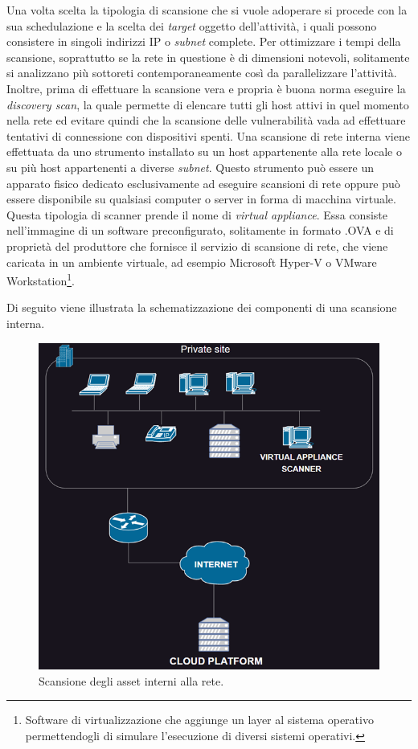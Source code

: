 \documentclass[target=mst,aauheader=]{thud}
\begin{document}
Una volta scelta la tipologia di scansione che si vuole adoperare si procede con la sua schedulazione e la scelta dei \textit{target} oggetto dell’attività, i quali possono consistere in singoli indirizzi IP o \textit{subnet} complete. Per ottimizzare i tempi della scansione, soprattutto se la rete in questione è di dimensioni notevoli, solitamente si analizzano più sottoreti contemporaneamente così da parallelizzare l’attività. Inoltre, prima di effettuare la scansione vera e propria è buona norma eseguire la \textit{discovery scan}, la quale permette di elencare tutti gli host attivi in quel momento nella rete ed evitare quindi che la scansione delle vulnerabilità vada ad effettuare tentativi di connessione con dispositivi spenti.
Una scansione di rete interna viene effettuata da uno strumento installato su un host appartenente alla rete locale o su più host appartenenti a diverse \textit{subnet}. Questo strumento può essere un apparato fisico dedicato esclusivamente ad eseguire scansioni di rete oppure può essere disponibile su qualsiasi computer o server in forma di macchina virtuale. Questa tipologia di scanner prende il nome di \textit{virtual appliance}. Essa consiste nell’immagine di un software preconfigurato, solitamente in formato .OVA e di proprietà del produttore che fornisce il servizio di scansione di rete, che viene caricata in un ambiente virtuale, ad esempio Microsoft Hyper-V o VMware Workstation\footnote{Software di virtualizzazione che aggiunge un layer al sistema operativo permettendogli di simulare l’esecuzione di diversi sistemi operativi.}.

Di seguito viene illustrata la schematizzazione dei componenti di una scansione interna.

\begin{figure}[h]
\centering
\includegraphics{images/scan_interna.png}
    \caption{Scansione degli asset interni alla rete.}
\end{figure}
\end{document}
